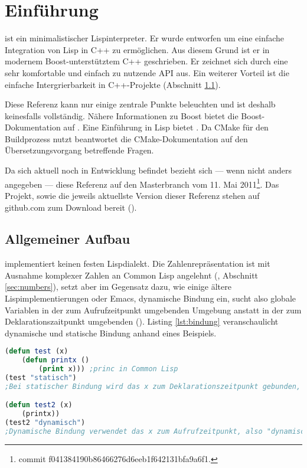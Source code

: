 \section{Einführung}
\label{sec:einfuehrung}

\projectname{} ist ein minimalistischer Lispinterpreter. Er wurde entworfen um eine einfache
Integration von Lisp in C++ zu ermöglichen. Aus diesem Grund ist er in modernem Boost-unterstütztem
C++ geschrieben. Er zeichnet sich durch eine sehr komfortable und einfach zu nutzende API aus.
Ein weiterer Vorteil ist die einfache Intergrierbarkeit in C++-Projekte (Abschnitt \ref{sec:environment}).

Diese Referenz kann nur einige zentrale Punkte beleuchten und ist deshalb keinesfalls vollständig. Nähere Informationen zu Boost bietet die Boost-Do\-ku\-men\-ta\-tion auf \cite{smart_ptr_online}. Eine Einführung in Lisp bietet \cite{graham_ansi_1995}. Da \projectname{} CMake für den Buildprozess nutzt beantwortet die CMake-Dokumentation auf \cite{cmake_online} den Übersetzungsvorgang betreffende Fragen.

Da sich \projectname{} aktuell noch in Entwicklung befindet bezieht sich --- wenn nicht anders angegeben --- diese Referenz auf den Masterbranch vom 11. Mai 2011\footnote{commit f041384190b86466276d6eeb1f642131bfa9a6f1.}.
Das Projekt, sowie die jeweils aktuellste Version dieser Referenz stehen auf github.com zum Download bereit (\cite{lisp_interaction_online}\cite{lisp_interaction_ref_online}). %

\subsection{Allgemeiner Aufbau}
\label{sec:environment}

\projectname{} implementiert keinen festen Lispdialekt. Die Zahlenrepräsentation ist mit Ausnahme komplexer Zahlen an Common Lisp angelehnt (\cite[S. 143ff]{graham_ansi_1995}, Abschnitt \ref{sec:numbers}), setzt aber im Gegensatz dazu, wie einige ältere Lispimplementierungen oder Emacs, dynamische Bindung ein, sucht also globale Variablen in der zum Aufrufzeitpunkt umgebenden Umgebung anstatt in der zum Deklarationszaitpunkt umgebenden (\cite[36, 63]{wilhelm_uebersetzerbau_2007}\cite[112]{graham_ansi_1995}). Listing \ref{lst:bindung} veranschaulicht dynamische und statische Bindung anhand eines Beispiels.

\begin{lstlisting}[caption={dynamische Bindung}, label=lst:bindung, language=Lisp]
(defun test (x)
    (defun printx ()
        (print x))) ;princ in Common Lisp
(test "statisch")
;Bei statischer Bindung wird das x zum Deklarationszeitpunkt gebunden, also "statisch"

(defun test2 (x)
    (printx))
(test2 "dynamisch")
;Dynamische Bindung verwendet das x zum Aufrufzeitpunkt, also "dynamisch"
\end{lstlisting}

